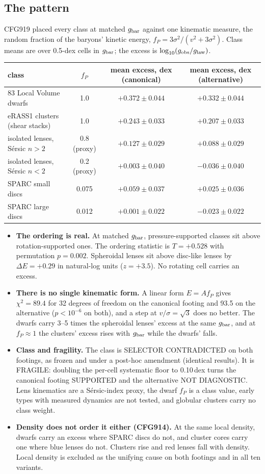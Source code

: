 \documentclass[10pt]{article}
\begin{document}
\subsection{The pattern}
CFG919 placed every class at matched $g_{\rm bar}$ against one kinematic measure, the random fraction of the baryons' kinetic energy, $f_P=3\sigma^2/(v^2+3\sigma^2)$. Class means are over 0.5-dex cells in $g_{\rm bar}$; the excess is $\log_{10}(g_{\rm obs}/g_{\rm law})$.
\begin{center}\small
\begin{tabular}{lccc}
\toprule
class & $f_P$ & mean excess, dex (canonical) & mean excess, dex (alternative)\\
\midrule
83 Local Volume dwarfs & 1.0 & $+0.372\pm0.044$ & $+0.332\pm0.044$\\
eRASS1 clusters (shear stacks) & 1.0 & $+0.243\pm0.033$ & $+0.207\pm0.033$\\
isolated lenses, S\'ersic $n>2$ & 0.8 (proxy) & $+0.127\pm0.029$ & $+0.088\pm0.029$\\
isolated lenses, S\'ersic $n<2$ & 0.2 (proxy) & $+0.003\pm0.040$ & $-0.036\pm0.040$\\
SPARC small discs & 0.075 & $+0.059\pm0.037$ & $+0.025\pm0.036$\\
SPARC large discs & 0.012 & $+0.001\pm0.022$ & $-0.023\pm0.022$\\
\bottomrule
\end{tabular}
\end{center}
\begin{itemize}
\item \textbf{The ordering is real.} At matched $g_{\rm bar}$, pressure-supported classes sit above rotation-supported ones. The ordering statistic is $T=+0.528$ with permutation $p=0.002$. Spheroidal lenses sit above disc-like lenses by $\Delta E=+0.29$ in natural-log units ($z=+3.5$). No rotating cell carries an excess.
\item \textbf{There is no single kinematic form.} A linear form $E=A f_P$ gives $\chi^2=89.4$ for 32 degrees of freedom on the canonical footing and 93.5 on the alternative ($p<10^{-6}$ on both), and a step at $v/\sigma=\sqrt3$ does no better. The dwarfs carry 3--5 times the spheroidal lenses' excess at the same $g_{\rm bar}$, and at $f_P\approx1$ the clusters' excess rises with $g_{\rm bar}$ while the dwarfs' falls.
\item \textbf{Class and fragility.} The class is SELECTOR CONTRADICTED on both footings, as frozen and under a post-hoc amendment (identical results). It is FRAGILE: doubling the per-cell systematic floor to 0.10\,dex turns the canonical footing SUPPORTED and the alternative NOT DIAGNOSTIC. Lens kinematics are a S\'ersic-index proxy, the dwarf $f_P$ is a class value, early types with measured dynamics are not tested, and globular clusters carry no class weight.
\item \textbf{Density does not order it either (CFG914).} At the same local density, dwarfs carry an excess where SPARC discs do not, and cluster cores carry one where blue lenses do not. Clusters rise and red lenses fall with density. Local density is excluded as the unifying cause on both footings and in all ten variants.
\end{itemize}
\end{document}
